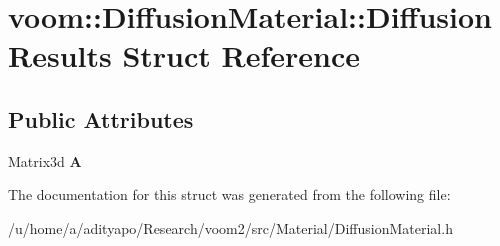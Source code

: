 \hypertarget{structvoom_1_1_diffusion_material_1_1_diffusion_results}{
\section{voom::DiffusionMaterial::DiffusionResults Struct Reference}
\label{structvoom_1_1_diffusion_material_1_1_diffusion_results}
}
\subsection*{Public Attributes}
\begin{DoxyCompactItemize}
\item 
\hypertarget{structvoom_1_1_diffusion_material_1_1_diffusion_results_afa2d64a8150db30a6f16b468159d20c1}{
Matrix3d {\bfseries A}}
\label{structvoom_1_1_diffusion_material_1_1_diffusion_results_afa2d64a8150db30a6f16b468159d20c1}

\end{DoxyCompactItemize}


The documentation for this struct was generated from the following file:\begin{DoxyCompactItemize}
\item 
/u/home/a/adityapo/Research/voom2/src/Material/DiffusionMaterial.h\end{DoxyCompactItemize}
